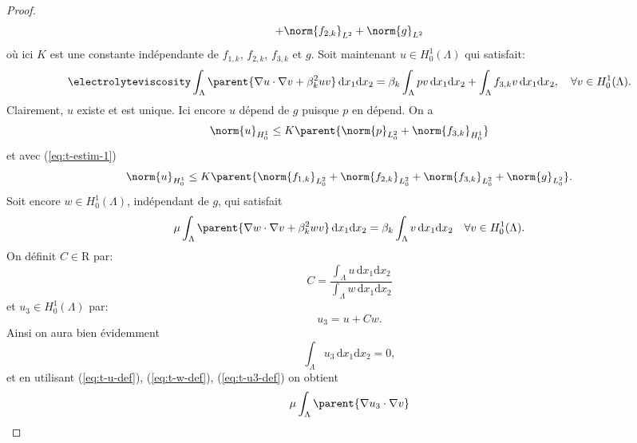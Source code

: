 \begin{proof}
\begin{equation}
{    + \norm{f_{2,k}}_{L^2} %
    + \norm{g}_{L^2}}
  \end{equation}
  où ici $K$ est une constante indépendante de $f_{1,k}$, $f_{2,k}$,
  $f_{3,k}$ et $g$. Soit maintenant $u \in H_0^1(\Lambda)$ qui satisfait:
  \begin{equation}\label{eq:t-u-def}
    \electrolyteviscosity\int_\Lambda \parent{\nabla u\cdot \nabla v %
                         + \beta_k ^2 uv}\,\mathrm dx_1\mathrm dx_2 %
    = \beta_k\int_\Lambda pv\,\mathrm dx_1\mathrm dx_2 %
    + \int_\Lambda f_{3,k}v\,\mathrm dx_1\mathrm dx_2,%
    \quad \forall v\in H_0^1(\Lambda).
  \end{equation}
  Clairement, $u$ existe et est unique. Ici encore $u$ dépend de $g$
  puisque $p$ en dépend. On a
  \begin{equation}\label{eq:t-estim-2}
\norm{u}_{H_0^1} \leq K\parent{\norm{p}_{L^2_0} + \norm{f_{3,k}}_{H^1_0}}
  \end{equation}
  et avec (\ref{eq:t-estim-1})
  \begin{equation}\label{eq:t-estim-3}
    \norm{u}_{H_0^1} %
    \leq K\parent{\norm{f_{1,k}}_{L^2_0} %
      + \norm{f_{2,k}}_{L^2_0} %
      + \norm{f_{3,k}}_{L^2_0} %
      + \norm{g}_{L^2_0}}.
  \end{equation}
  Soit encore $w \in H_0^1(\Lambda)$, indépendant de $g$, qui satisfait
  \begin{equation}\label{eq:t-w-def}
    \mu \int_\Lambda \parent{\nabla w\cdot\nabla v %
      + \beta_k^2 wv}\,\mathrm dx_1\mathrm dx_2 %
    = \beta_k \int_\Lambda v\,\mathrm dx_1\mathrm dx_2 %
    \quad \forall v\in H_0^1(\Lambda).
  \end{equation}
  On définit $C\in\mathrm R$ par:
  \begin{equation}\label{eq:t-c-def}
    C = \frac{\displaystyle\int_\Lambda u\,\mathrm dx_1\mathrm dx_2}%
             {\displaystyle\int_\Lambda w\,\mathrm dx_1\mathrm dx_2}
  \end{equation}
  et $u_3\in H_0^1(\Lambda)$ par:
  \begin{equation}\label{eq:t-u3-def}
    u_3 = u + Cw.
  \end{equation}
  Ainsi on aura bien évidemment
  \begin{equation}
    \int_\Lambda u_3\,\mathrm dx_1\mathrm dx_2 = 0,
  \end{equation}
  et en utilisant (\ref{eq:t-u-def}), (\ref{eq:t-w-def}),
  (\ref{eq:t-u3-def}) on obtient
  \begin{equation}
    \mu\int_\Lambda \parent{\nabla u_3\cdot \nabla v %
}
\end{equation}
\end{proof}
